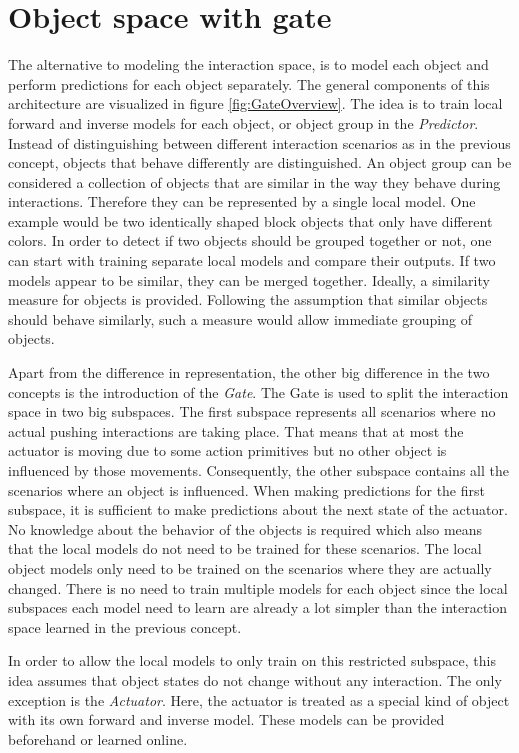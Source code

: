 \section{Object space with gate \label{sec:gate}}

The alternative to modeling the interaction space, is to model each object and perform predictions for each object separately. 
The general components of this architecture are visualized in figure \ref{fig:GateOverview}.
The idea is to train local forward and inverse models for each object, or object group in the \textit{Predictor}. %
Instead of distinguishing between different interaction scenarios as in the previous concept, objects that behave differently are distinguished. 
An object group can be considered a collection of objects that are similar in the way they behave during interactions. Therefore they can be represented by a single local model. One example would be two identically shaped block objects that only have different colors. In order to detect if two objects should be grouped together or not, one can start with training separate local models and compare their outputs. If two models appear to be similar, they can be merged together. Ideally, a similarity measure for objects is provided. Following the assumption that similar objects should behave similarly, such a measure would allow immediate grouping of objects.

Apart from the difference in representation, the other big difference in the two concepts is the introduction of the \textit{Gate}. The Gate is used to split the interaction space in two big subspaces. The first subspace represents all scenarios where no actual pushing interactions are taking place. That means that at most the actuator is moving due to some action primitives but no other object is influenced by those movements. Consequently, the other subspace contains all the scenarios where an object is influenced. When making predictions for the first subspace, it is sufficient to make predictions about the next state of the actuator. No knowledge about the behavior of the objects is required which also means that the local models do not need to be trained for these scenarios. The local object models only need to be trained on the scenarios where they are actually changed. 
There is no need to train multiple models for each object since the local subspaces each model need to learn are already a lot simpler than the interaction space learned in the previous concept.

In order to allow the local models to only train on this restricted subspace, this idea assumes that object states do not change without any interaction. The only exception is the \textit{Actuator}. Here, the actuator is treated as a special kind of object with its own forward and inverse model. These models can be provided beforehand or learned online. 

